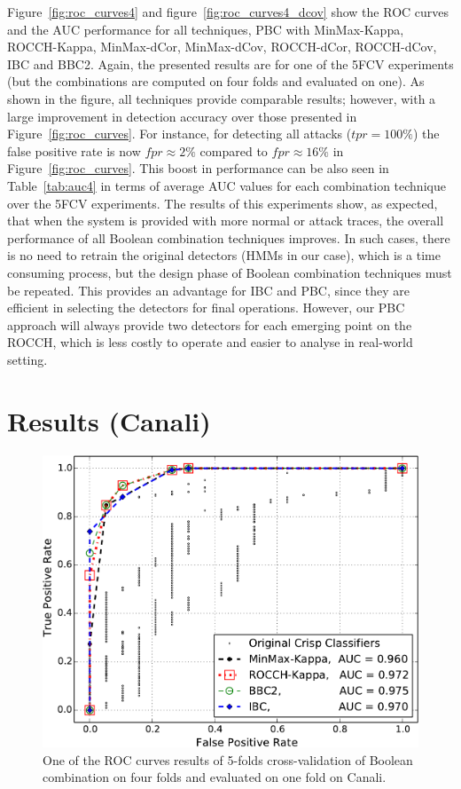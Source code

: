 Figure~\ref{fig:roc_curves4} and figure~\ref{fig:roc_curves4_dcov} show the ROC curves and the AUC performance for all techniques, PBC with MinMax-Kappa, ROCCH-Kappa, MinMax-dCor, MinMax-dCov, ROCCH-dCor, ROCCH-dCov, IBC and BBC2.
Again, the presented results are for one of the 5FCV experiments (but the combinations are computed on four folds and evaluated on one).
As shown in the figure, all techniques provide comparable results; however, with a large improvement in detection accuracy over those presented in Figure~\ref{fig:roc_curves}.
For instance, for detecting all attacks ($tpr = 100\%$) the false positive rate is now $fpr\approx  2\%$ compared to $fpr\approx 16\%$ in Figure~\ref{fig:roc_curves}.
This boost in performance can be also seen in Table~\ref{tab:auc4} in terms of average AUC values for each combination technique over the 5FCV experiments.
The results of this experiments show, as expected, that when the system is provided with more normal or attack traces, the overall performance of all Boolean combination techniques improves.
In such cases, there is no need to retrain the original detectors (HMMs in our case), which is a time consuming process, but the design phase of Boolean combination techniques must be repeated.
This provides an advantage for IBC and PBC, since they are efficient in selecting the detectors for final operations.
However, our PBC approach will always provide two detectors for each emerging point on the ROCCH, which is less costly to operate and easier to analyse in real-world setting.

\section{Results (Canali)}
\label{sec:results-canali}

\begin{figure}[t]
\centering
\includegraphics[width=\columnwidth]{figs/Canali/IBC_BCC_Pruned_Classifier_ConvexHull_withoutRandom_validation_4fold_kappa}
\caption{One of the ROC curves results of 5-folds cross-validation of Boolean combination on four folds and evaluated on one fold on Canali.}
\label{fig:roc_curves_canali}
\end{figure}

